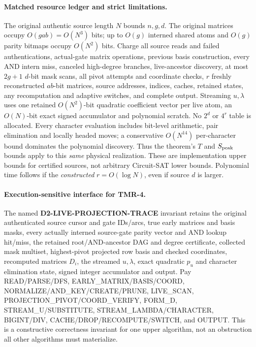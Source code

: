 \documentclass[11pt]{article}
\begin{document}
\paragraph{Matched resource ledger and strict limitations.}
The original authentic source length $N$ bounds $n,g,d$.
The original matrices occupy $O(gab)=O(N^3)$ bits;
up to $O(g)$ interned shared atoms and $O(g)$ parity bitmaps
occupy $O(N^2)$ bits. Charge all source reads and failed
authentications, actual-gate matrix operations, previous basis
construction, every AND intern miss, canceled high-degree
branches, live-ancestor discovery, at most $2g+1$
$d$-bit mask scans, all pivot attempts and coordinate checks,
$r$ freshly reconstructed $ab$-bit matrices, source addresses,
indices, caches, retained states, any recomputation and adaptive
switches, and complete output.
Streaming $u,\lambda$ uses one retained $O(N^2)$-bit quadratic
coefficient vector per live atom, an $O(N)$-bit exact signed
accumulator and polynomial scratch. No $2^d$ or $4^r$
table is allocated. Every character evaluation includes
bit-level arithmetic, pair elimination and locally headed
moves; a conservative $O(N^{14})$ per-character bound
dominates the polynomial discovery. Thus the theorem's
$T$ and $S_{\rm peak}$ bounds apply to this \emph{same}
physical realization. These are implementation upper bounds
for certified sources, not arbitrary Circuit-SAT lower bounds.
Polynomial time follows if the \emph{constructed} $r=O(\log N)$,
even if source $d$ is larger.

\paragraph{Execution-sensitive interface for TMR-4.}
The named \textbf{D2-LIVE-PROJECTION-TRACE} invariant retains
the original authenticated source cursor and gate IDs/arcs,
true early matrices and basis masks, every actually interned
source-gate parity vector and AND lookup hit/miss, the retained
root/AND-ancestor DAG and degree certificate, collected mask
multiset, highest-pivot projected row basis and checked
coordinates, recomputed matrices $D_i$, the streamed
$u,\lambda$, exact quadratic $p_u$ and character elimination
state, signed integer accumulator and output.
Pay READ/PARSE/DFS, EARLY\_MATRIX/BASIS/COORD,
NORMALIZE/AND\_KEY/CREATE/PRUNE, LIVE\_SCAN,
PROJECTION\_PIVOT/COORD\_VERIFY, FORM\_D,
STREAM\_U/SUBSTITUTE, STREAM\_LAMBDA/CHARACTER,
BIGINT/DIV, CACHE/DROP/RECOMPUTE/SWITCH, and OUTPUT.
This is a constructive correctness invariant for one
upper algorithm, not an obstruction all other algorithms
must materialize.
\end{document}
